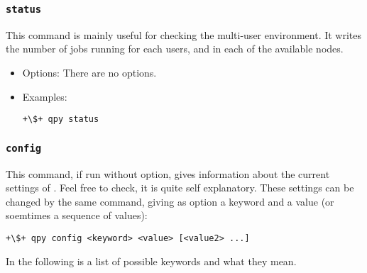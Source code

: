 \documentclass[a4paper,12pt]{article}
\begin{document}
\subsubsection{\texttt{status}}

This command is mainly useful for checking the multi-user environment.
It writes the number of jobs running for each users, and in each of the available nodes.

\begin{itemize}
\item Options:
  There are no options.
  
\item Examples:

  \begin{lstlisting}[style=BashStyle]
+\$+ qpy status
  \end{lstlisting}
\end{itemize}

\subsubsection{\texttt{config}}

This command, if run without option, gives information about the current settings of \qpy{}.
Feel free to check, it is quite self explanatory.
These settings can be changed by the same command, giving as option a keyword and a value (or soemtimes a sequence of values):

\begin{lstlisting}[style=BashStyle]
+\$+ qpy config <keyword> <value> [<value2> ...]
\end{lstlisting}

In the following is a list of possible keywords and what they mean.
\end{document}
